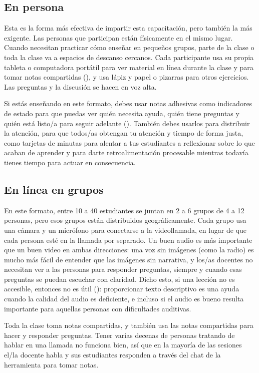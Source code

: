 \subsection*{En persona}

Esta es la forma más efectiva de impartir esta capacitación,
pero también la más exigente.
Las personas que participan están físicamente en el mismo lugar.
Cuando necesitan practicar cómo enseñar en pequeños grupos,
parte de la clase o toda la clase va a espacios de descanso cercanos.
Cada participante usa su propia tableta o computadora portátil para ver material en línea durante la clase
y para tomar notas compartidas (),
y usa lápiz y papel o pizarras para otros ejercicios.
Las preguntas y la discusión se hacen en voz alta.

Si estás enseñando en este formato,
debes usar notas adhesivas como indicadores de estado
para que puedas ver quién necesita ayuda,
quién tiene preguntas
y quién está listo/a para seguir adelante ().
También debes usarlos para distribuir la atención,
para que todos/as obtengan tu atención y tiempo de forma justa,
como tarjetas de minutas para alentar a tus estudiantes a reflexionar sobre lo que acaban de aprender
y para darte retroalimentación procesable mientras todavía tienes tiempo para actuar en consecuencia.

\subsection*{En línea en grupos}

En este formato,
entre 10 a 40 estudiantes se juntan en 2 a 6 grupos de 4 a 12 personas,
pero esos grupos están distribuidos geográficamente.
Cada grupo usa una cámara y un micrófono para conectarse a la videollamada,
en lugar de que cada persona esté en la llamada por separado.
Un buen audio es más importante que un buen video en ambas direcciones:
una voz sin imágenes (como la radio)
es mucho más fácil de entender que las imágenes sin narrativa,
y los/as docentes no necesitan ver a las personas para responder preguntas,
siempre y cuando esas preguntas se puedan escuchar con claridad.
Dicho esto,
si una lección no es accesible, entonces no es útil ():
proporcionar texto descriptivo es una ayuda cuando la calidad del audio es deficiente,
e incluso si el audio es bueno resulta importante para aquellas personas con dificultades auditivas. 

Toda la clase toma notas compartidas,
y también usa las notas compartidas para hacer y responder preguntas.
Tener varias decenas de personas tratando de hablar en una llamada no funciona bien,
así que en la mayoría de las sesiones
el/la docente habla y sus estudiantes responden a través del chat de la herramienta para tomar notas.

